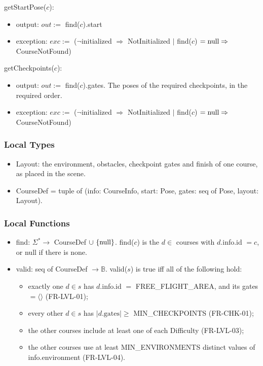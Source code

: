 \documentclass[12pt, titlepage]{article}
\newcommand{\True}{\textnormal{true}}
\newcommand{\nul}{\textnormal{null}}
\newcommand{\noinit}{$\neg$initialized $\Rightarrow$ NotInitialized}
\begin{document}
\noindent getStartPose($c$):
\begin{itemize}
\item output: $out :=$ find($c$).start
\item exception: $exc :=$ (\noinit{} $|$ find($c$) $= \nul \Rightarrow$
  CourseNotFound)
\end{itemize}

\noindent getCheckpoints($c$):
\begin{itemize}
\item output: $out :=$ find($c$).gates. The poses of the required checkpoints,
  in the required order.
\item exception: $exc :=$ (\noinit{} $|$ find($c$) $= \nul \Rightarrow$
  CourseNotFound)
\end{itemize}

\subsubsection{Local Types}

\begin{itemize}
\item Layout: the environment, obstacles, checkpoint gates and finish of one
  course, as placed in the scene.
\item CourseDef = tuple of (info: CourseInfo, start: Pose, gates: seq of Pose,
  layout: Layout).
\end{itemize}

\subsubsection{Local Functions}

\begin{itemize}
\item find: $\Sigma^* \rightarrow$ CourseDef $\cup \ \{\nul\}$. find($c$) is
  the $d \in$ courses with $d$.info.id $= c$, or \nul{} if there is none.
\item valid: seq of CourseDef $\rightarrow \mathbb{B}$. valid($s$) is \True{}
  iff all of the following hold:
  \begin{itemize}
  \item exactly one $d \in s$ has $d$.info.id $=$ FREE\_FLIGHT\_AREA, and its
    gates $= \langle\rangle$ (FR-LVL-01);
  \item every other $d \in s$ has $|d.\text{gates}| \geq$ MIN\_CHECKPOINTS
    (FR-CHK-01);
  \item the other courses include at least one of each Difficulty
    (FR-LVL-03);
  \item the other courses use at least MIN\_ENVIRONMENTS distinct values of
    info.environment (FR-LVL-04).
  \end{itemize}
\end{itemize}
\end{document}
